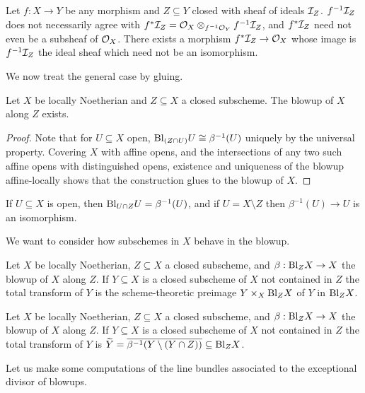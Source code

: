 \begin{remark}
    Let $f:X\to Y$ be any morphism and $Z\subseteq Y$ closed with sheaf of ideals $\mathcal{I}_{Z}$. $f^{-1}\mathcal{I}_{Z}$ does not necessarily agree with $f^{*}\mathcal{I}_{Z}=\mathcal{O}_{X}\otimes_{f^{-1}\mathcal{O}_{Y}}f^{-1}\mathcal{I}_{Z}$, and $f^{*}\mathcal{I}_{Z}$ need not even be a subsheaf of $\mathcal{O}_{X}$. There exists a morphism $f^{*}\mathcal{I}_{Z}\to\mathcal{O}_{X}$ whose image is $f^{-1}\mathcal{I}_{Z}$ the ideal sheaf which need not be an isomorphism. 
\end{remark}
We now treat the general case by gluing.  
\begin{theorem}\label{thm: existence of blowups}
    Let $X$ be locally Noetherian and $Z\subseteq X$ a closed subscheme. The blowup of $X$ along $Z$ exists. 
\end{theorem}
\begin{proof}
    Note that for $U\subseteq X$ open, $\mathrm{Bl}_{(Z\cap U)}U\cong \beta^{-1}(U)$ uniquely by the universal property. Covering $X$ with affine opens, and the intersections of any two such affine opens with distinguished opens, existence and uniqueness of the blowup affine-locally  shows that the construction glues to the blowup of $X$. 
\end{proof}
\begin{remark}\label{rmk: blowup of open subschemes}
    If $U\subseteq X$ is open, then $\mathrm{Bl}_{U\cap Z}U=\beta^{-1}(U)$, and if $U=X\setminus Z$ then $\beta^{-1}(U)\to U$ is an isomorphism. 
\end{remark}
We want to consider how subschemes in $X$ behave in the blowup. 
\begin{definition}\label{def: strict transform}
    Let $X$ be locally Noetherian, $Z\subseteq X$ a closed subscheme, and $\beta:\mathrm{Bl}_{Z}X\to X$ the blowup of $X$ along $Z$. If $Y\subseteq X$ is a closed subscheme of $X$ not contained in $Z$ the total transform of $Y$ is the scheme-theoretic preimage $Y\times_{X}\mathrm{Bl}_{Z}X$ of $Y$ in $\mathrm{Bl}_{Z}X$. 
\end{definition}
\begin{definition}\label{def: total transform}
    Let $X$ be locally Noetherian, $Z\subseteq X$ a closed subscheme, and $\beta:\mathrm{Bl}_{Z}X\to X$ the blowup of $X$ along $Z$. If $Y\subseteq X$ is a closed subscheme of $X$ not contained in $Z$ the total transform of $Y$ is $\widetilde{Y}=\overline{\beta^{-1}(Y\setminus(Y\cap Z))}\subseteq\mathrm{Bl}_{Z}X$. 
\end{definition}
Let us make some computations of the line bundles associated to the exceptional divisor of blowups. 
